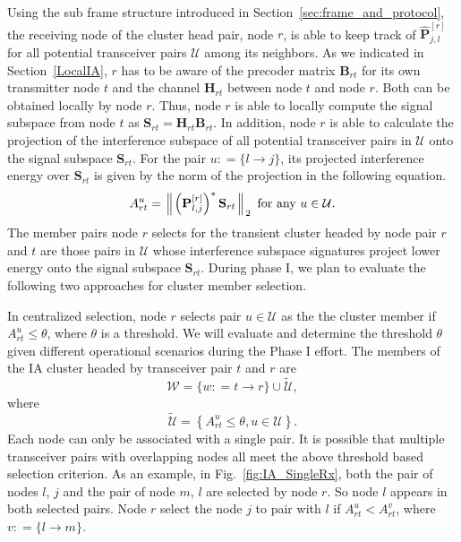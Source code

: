 \documentclass[letterpaper,11pt]{article}
\begin{document}
Using the sub frame structure introduced in Section~\ref{sec:frame_and_protocol}, the receiving node of the cluster head pair, node $r$, is able to keep track of $\hat{\mathbf{P}}^{[r]}_{j,l}$ for all potential transceiver pairs $\mathcal{U}$ among its neighbors. As we indicated in Section~\ref{LocalIA}, $r$ has to be aware of the precoder matrix $\mathbf{B}_{rt}$ for its own transmitter node $t$ and the channel $\mathbf{H}_{rt}$ between node $t$ and node $r$. Both can be obtained locally by node $r$. Thus, node $r$ is able to locally compute the signal subspace from node $t$ as $\mathbf{S}_{rt}=\mathbf{H}_{rt}\mathbf{B}_{rt}$. In addition, node $r$ is able to calculate the projection of the interference subspace of all potential transceiver pairs in $\mathcal{U}$ onto the signal subspace $\mathbf{S}_{rt}$. For the pair $u\colon=\{l\rightarrow j\}$, its projected interference energy over $\mathbf{S}_{rt}$ is given by the norm of the projection in the following equation.
\begin{equation}\label{projection}
A^{u}_{rt}=\left\Arrowvert\left(\mathbf{P}^{[r]}_{l,j}\right)^{*}\mathbf{S}_{rt}\right\Arrowvert_{2}~\textrm{for~any~}u\in\mathcal{U}.
\end{equation}
The member pairs node $r$ selects for the transient cluster headed by node pair $r$ and $t$ are those pairs in $\mathcal{U}$ whose interference subspace signatures project lower energy onto the signal subspace $\mathbf{S}_{rt}$.  During phase I, we plan to evaluate the following two approaches for cluster member selection.


In centralized selection, node $r$ selects pair $u\in\mathcal{U}$ as the the cluster member if  $A^{u}_{rt}\le\theta$, where $\theta$ is a threshold. We will evaluate and determine the threshold $\theta$ given different operational scenarios during the Phase I effort. The members of the IA cluster headed by transceiver pair $t$ and $r$ are 
$$
\mathcal{W}=\{w\colon={t\rightarrow r}\}\cup \tilde{\mathcal{U}},
$$
where
\begin{equation}\label{tilde_U}
\tilde{\mathcal{U}} = \left\{ A^{u}_{rt}\le\theta, u\in\mathcal{U} \right\}.
\end{equation}
Each node can only be associated with a single pair. It is possible that multiple transceiver pairs with overlapping nodes all meet the above threshold based selection criterion. As an example, in Fig.~\ref{fig:IA_SingleRx}, both the pair of nodes $l$, $j$ and the pair of node $m$, $l$ are selected by node $r$. So node $l$ appears in both selected pairs. Node $r$ select the node $j$ to pair with $l$ if $A^{u}_{rt} < A^{v}_{rt}$, where $v\colon=\{l\rightarrow m\}$.
\end{document}
